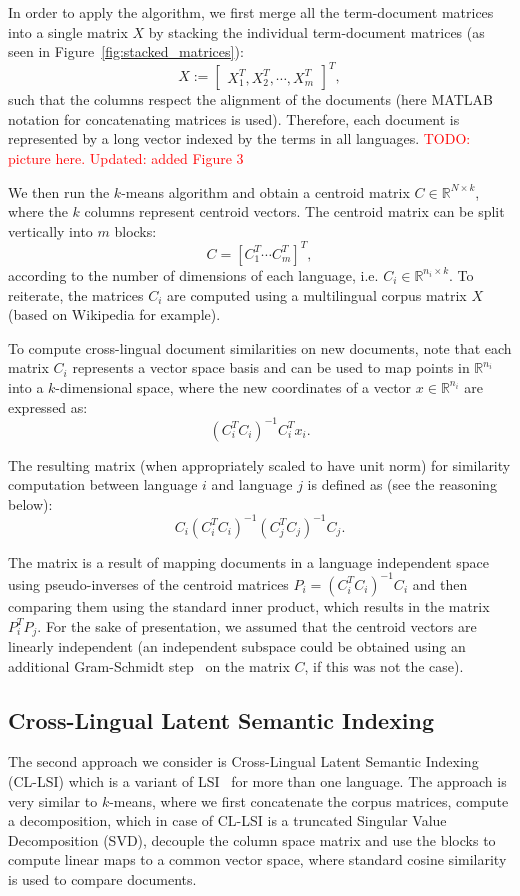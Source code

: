 \documentclass[twoside,11pt]{article}
\newcommand{\todo}[1]{\textcolor{red}{TODO: #1}}
\newcommand{\RR}{\mathbb{R}}
\begin{document}
 In order to apply the algorithm, we first merge all the term-document matrices into a single matrix $X$ by stacking the individual term-document matrices (as seen in Figure~\ref{fig:stacked_matrices}):
$$X := \begin{bmatrix}X_1^T ,X_2^T, \cdots, X_m^T \end{bmatrix}^T,$$
such that the columns respect the alignment of the documents (here MATLAB notation for concatenating matrices is used). Therefore, each document  is represented by a long vector indexed by the terms in all languages. \todo{picture here. Updated: added Figure 3}

We then run the $k$-means algorithm \cite{kmeans} and obtain a centroid matrix $C \in \RR^{N \times k}$, where the $k$ columns represent centroid vectors. The centroid matrix can be split vertically into $m$ blocks: $$C = [C_1^T \cdots C_m^T]^T,$$ according to the number of dimensions of each language, i.e. $C_i \in \RR^{n_i \times k}$.
%
To reiterate, the matrices $C_i$ are computed using a multilingual corpus matrix $X$ (based on Wikipedia for example).

To compute  cross-lingual document similarities on new documents, note that each matrix $C_i$ represents a vector space basis and can be used to map points in $\RR^{n_i}$ into a $k$-dimensional space, where the new coordinates of a vector $x \in \RR^{n_i}$ are expressed as: $$(C_i^T C_i)^{-1} C_i^T x_i.$$

The resulting matrix (when appropriately scaled to have unit norm) for similarity computation between language $i$ and language $j$ is defined as (see the reasoning below):
$$C_i(C_i^T C_i)^{-1} (C_j^T C_j)^{-1} C_j.$$

The matrix is a result of mapping documents in a language independent space using pseudo-inverses of the centroid matrices $P_i = (C_i^T C_i)^{-1} C_i$ and then comparing them using the standard inner product, which results in the matrix $P_i^T P_j$. For the sake of presentation, we assumed that the centroid vectors are linearly independent (an independent subspace could be obtained using an additional Gram-Schmidt step~\cite{golub} on the matrix $C$, if this was not the case).

\subsection{Cross-Lingual Latent Semantic Indexing}\label{sec:LSI}

The second approach we consider is Cross-Lingual Latent Semantic Indexing (CL-LSI)\cite{cl_lsi} which is a variant of LSI~ for more than one language. The approach is very similar to $k$-means, where we first concatenate the corpus matrices, compute a decomposition, which in case of CL-LSI is a truncated Singular Value Decomposition (SVD), decouple the
 column space matrix and use the blocks to compute linear maps to a common vector space, where standard cosine similarity is used to compare documents.
\end{document}
